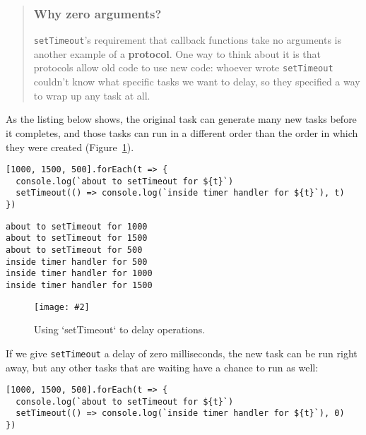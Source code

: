 \documentclass[krantzl]{krantz}
\newcommand{\figpdf}[4]{\begin{figure}%
\centering%
\texttt{[image: \#2]}%
\caption{#3}%
\label{#1}%
\end{figure}}
\newcommand{\figref}[1]{Figure~\ref{#1}}
\newcommand{\glossref}[1]{\textbf{#1}}
\newenvironment{callout}{\savenotes\begin{tBox}\begin{quotation}\toggletrue{inbox}\renewcommand{\thempfootnote}{\arabic{footnote}}}{\end{quotation}\vspace{\baselineskip}\end{tBox}\togglefalse{inbox}\spewnotes}
\begin{document}
\begin{callout}


\subsubsection*{Why zero arguments?}


\texttt{setTimeout}'s requirement that callback functions take no arguments
is another example of a \glossref{protocol}.
One way to think about it is that protocols allow old code to use new code:
whoever wrote \texttt{setTimeout} couldn't know what specific tasks we want to delay,
so they specified a way to wrap up any task at all.

\end{callout}


As the listing below shows,
the original task can generate many new tasks before it completes,
and those tasks can run in a different order than the order in which they were created
(\figref{async-programming-set-timeout}).


\begin{lstlisting}[frame=single,frameround=tttt]
[1000, 1500, 500].forEach(t => {
  console.log(`about to setTimeout for ${t}`)
  setTimeout(() => console.log(`inside timer handler for ${t}`), t)
})
\end{lstlisting}



\begin{lstlisting}[frame=single,frameround=tttt]
about to setTimeout for 1000
about to setTimeout for 1500
about to setTimeout for 500
inside timer handler for 500
inside timer handler for 1000
inside timer handler for 1500
\end{lstlisting}


\figpdf{async-programming-set-timeout}{./async-programming/set-timeout.pdf}{Using `setTimeout` to delay operations.}{0.6}


If we give \texttt{setTimeout} a delay of zero milliseconds,
the new task can be run right away,
but any other tasks that are waiting have a chance to run as well:


\begin{lstlisting}[frame=single,frameround=tttt]
[1000, 1500, 500].forEach(t => {
  console.log(`about to setTimeout for ${t}`)
  setTimeout(() => console.log(`inside timer handler for ${t}`), 0)
})
\end{lstlisting}
\end{document}
